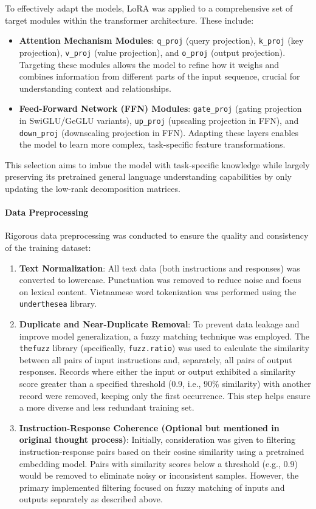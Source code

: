 \documentclass[conference]{IEEEtran}
\begin{document}
To effectively adapt the models, LoRA was applied to a comprehensive set of target modules within the transformer architecture. These include:
\begin{itemize}
    \item \textbf{Attention Mechanism Modules}: \texttt{q\_proj} (query projection), \texttt{k\_proj} (key projection), \texttt{v\_proj} (value projection), and \texttt{o\_proj} (output projection). Targeting these modules allows the model to refine how it weighs and combines information from different parts of the input sequence, crucial for understanding context and relationships.
    \item \textbf{Feed-Forward Network (FFN) Modules}: \texttt{gate\_proj} (gating projection in SwiGLU/GeGLU variants), \texttt{up\_proj} (upscaling projection in FFN), and \texttt{down\_proj} (downscaling projection in FFN). Adapting these layers enables the model to learn more complex, task-specific feature transformations.
\end{itemize}
This selection aims to imbue the model with task-specific knowledge while largely preserving its pretrained general language understanding capabilities by only updating the low-rank decomposition matrices.

\paragraph{Data Preprocessing}
Rigorous data preprocessing was conducted to ensure the quality and consistency of the training dataset:
\begin{enumerate}
    \item \textbf{Text Normalization}: All text data (both instructions and responses) was converted to lowercase. Punctuation was removed to reduce noise and focus on lexical content. Vietnamese word tokenization was performed using the \texttt{underthesea} library.
    \item \textbf{Duplicate and Near-Duplicate Removal}: To prevent data leakage and improve model generalization, a fuzzy matching technique was employed. The \texttt{thefuzz} library (specifically, \texttt{fuzz.ratio}) was used to calculate the similarity between all pairs of input instructions and, separately, all pairs of output responses. Records where either the input or output exhibited a similarity score greater than a specified threshold (0.9, i.e., 90\% similarity) with another record were removed, keeping only the first occurrence. This step helps ensure a more diverse and less redundant training set.
    \item \textbf{Instruction-Response Coherence (Optional but mentioned in original thought process)}: Initially, consideration was given to filtering instruction-response pairs based on their cosine similarity using a pretrained embedding model. Pairs with similarity scores below a threshold (e.g., 0.9) would be removed to eliminate noisy or inconsistent samples. However, the primary implemented filtering focused on fuzzy matching of inputs and outputs separately as described above.
\end{enumerate}
\end{document}
